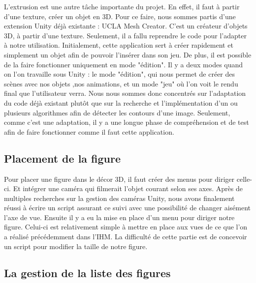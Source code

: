 \documentclass[a4paper,11pt]{article}
\begin{document}
		L'extrusion est une autre tâche importante du projet. En effet, il faut à partir d'une texture, créer un objet en 3D. Pour ce faire, nous sommes partis d'une extension Unity déjà existante : UCLA Mesh Creator. C'est un créateur d'objets 3D, à partir d'une texture. Seulement, il a fallu reprendre le code pour l'adapter à notre utilisation. Initialement, cette application sert à créer rapidement et simplement un objet afin de pouvoir l'insérer dans son jeu. De plus, il est possible de la faire fonctionner uniquement en mode "édition". Il y a deux modes quand on l'on travaille sous Unity : le mode "édition", qui nous permet de créer des scènes avec nos objets ,nos animations, et un mode "jeu" où l'on voit le rendu final que l'utilisateur verra. Nous nous sommes donc concentrés sur l'adaptation du code déjà existant plutôt que sur la recherche et l'implémentation d'un ou plusieurs algorithmes afin de détecter les contours d'une image. Seulement, comme c'est une adaptation, il y a une longue phase de compréhension et de test afin de faire fonctionner comme il faut cette application. 
		\subsection{Placement de la figure}
		
			Pour placer une figure dans le décor 3D, il faut créer des menus pour diriger celle-ci. Et intégrer une caméra qui filmerait l'objet courant selon ses axes. Après de multiples recherches sur la gestion des caméras Unity, nous avons finalement réussi à écrire un script assurant ce suivi avec une possibilité de changer aisément l'axe de vue. Ensuite il y a eu la mise en place d'un menu pour diriger notre figure. Celui-ci est relativement simple à mettre en place aux vues de ce que l'on a réalisé précédemment dans l'IHM. La difficulté de cette partie est de concevoir un script pour modifier la taille de notre figure.

		\subsection{La gestion de la liste des figures}
\end{document}
